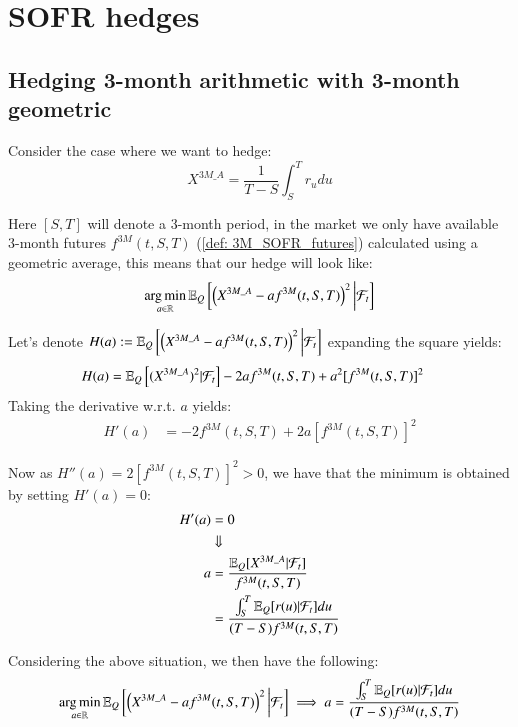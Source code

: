 \chapter{SOFR hedges}

\section{Hedging 3-month arithmetic with 3-month geometric}
Consider the case where we want to hedge: 
$$
X^{3M\_A} = \frac{1}{T-S}\int_{S}^{T}r_{u}du
$$

Here $[S,T]$ will denote a 3-month period, in the market we only have available
3-month futures $f^{3M}(t,S,T)$ (\ref{def: 3M_SOFR_futures})  calculated using a geometric average, this means that our hedge will look like: 
\begin{align*}
\operatorname*{arg\,min}\limits_{a \in \mathbb{R}}\mathbb{E}_{Q}\left[
\left(
X^{3M\_A}-af^{3M}(t,S,T)
\right)^{2}
\bigg{|}\mathcal{F}_{t}
\right]
\end{align*}

Let's denote $H(a) :=\mathbb{E}_{Q}\left[
\left(X^{3M\_A}-af^{3M}(t,S,T)
\right)^{2}
\bigg{|}\mathcal{F}_{t}
\right]
$ 
expanding the square yields:
\begin{align*}
H(a) &= \mathbb{E}_{Q}\left[(X^{3M\_A})^{2}|\mathcal{F}_{t}\right] -2af^{3M}(t,S,T) +
a^{2}[f^{3M}(t,S,T)]^{2}
\end{align*}
Taking the derivative w.r.t. $a$ yields: 
\begin{align*}
H'(a) &= -2f^{3M}(t,S,T) + 2a[f^{3M}(t,S,T)]^{2}  
\end{align*} 

Now as $H''(a) = 2[f^{3M}(t,S,T)]^{2} > 0$, we have that the minimum is obtained by setting $H'(a) = 0$:
\begin{align*}
H'(a) &= 0 \\ 
&\Downarrow \\ 
a &= \frac{
\mathbb{E}_{Q}[X^{3M\_A}|\mathcal{F}_{t}]
}{
f^{3M}(t,S,T)
} \\ 
&= \frac{
\int_{S}^{T}\mathbb{E}_{Q}[r(u)|\mathcal{F}_{t}]du
}{
(T-S)f^{3M}(t,S,T)
}
\end{align*}

\begin{result}
Considering the above situation, we then have the following:
\begin{align*}
\operatorname*{arg\,min}\limits_{a \in \mathbb{R}}\mathbb{E}_{Q}\left[
\left(
X^{3M\_A}-af^{3M}(t,S,T)
\right)^{2}
\bigg{|}\mathcal{F}_{t}
\right] 
\implies
a = \frac{
\int_{S}^{T}\mathbb{E}_{Q}[r(u)|\mathcal{F}_{t}]du
}{
(T-S)f^{3M}(t,S,T)
}
\end{align*}
\end{result} 

